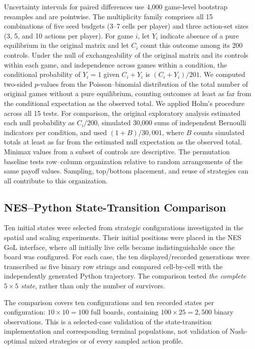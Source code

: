 \documentclass[games,article,submit,moreauthors]{Definitions/mdpi}
\begin{document}
Uncertainty intervals for paired differences use 4,000 game-level bootstrap resamples and are pointwise. The multiplicity family comprises all 15 combinations of five seed budgets (3--7 cells per player) and three action-set sizes (3, 5, and 10 actions per player). For game $i$, let $Y_i$ indicate absence of a pure equilibrium in the original matrix and let $C_i$ count this outcome among its 200 controls. Under the null of exchangeability of the original matrix and its controls within each game, and independence across games within a condition, the conditional probability of $Y_i=1$ given $C_i+Y_i$ is $(C_i+Y_i)/201$. We computed two-sided $p$-values from the Poisson--binomial distribution of the total number of original games without a pure equilibrium, counting outcomes at least as far from the conditional expectation as the observed total. We applied Holm's procedure across all 15 tests. For comparison, the original exploratory analysis estimated each null probability as $C_i/200$, simulated 30,000 sums of independent Bernoulli indicators per condition, and used $(1+B)/30{,}001$, where $B$ counts simulated totals at least as far from the estimated null expectation as the observed total. Minimax values from a subset of controls are descriptive. The permutation baseline tests row--column organization relative to random arrangements of the same payoff values. Sampling, top/bottom placement, and reuse of strategies can all contribute to this organization.

\subsection{NES--Python State-Transition Comparison}\label{sec:validation_method}

Ten initial states were selected from strategic configurations investigated in the spatial and scaling experiments. Their initial positions were placed in the NES GoL interface, where all initially live cells became indistinguishable once the board was configured. For each case, the ten displayed/recorded generations were transcribed as five binary row strings and compared cell-by-cell with the independently generated Python trajectory. The comparison tested \emph{the complete $5\times5$ state}, rather than only the number of survivors.

The comparison covers ten configurations and ten recorded states per configuration: $10\times10=100$ full boards, containing $100\times25=2{,}500$ binary observations. This is a selected-case validation of the state-transition implementation and corresponding terminal populations, not validation of Nash-optimal mixed strategies or of every sampled action profile.
\end{document}
